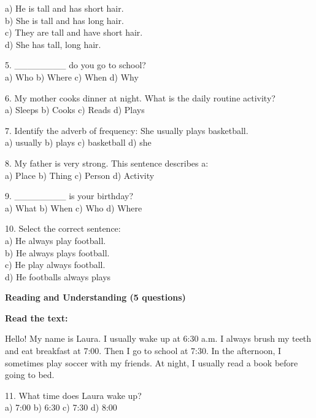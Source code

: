 \documentclass[12pt, a4paper]{article}
\begin{document}
\medskip{}

a) He is tall and has short hair. \\ b) She is tall and has long hair. \\ c)
They are tall and have short hair. \\ d) She has tall, long hair.

\smallskip

5. \_\_\_\_\_\_\_\_ do you go to school?\\
a) Who \quad b) Where \quad c) When \quad d) Why

\smallskip

6. My mother cooks dinner at night. What is the daily routine activity?\\
a) Sleeps \quad b) Cooks \quad c) Reads \quad d) Plays

\smallskip

7. Identify the adverb of frequency: She usually plays basketball.\\
a) usually \quad b) plays \quad c) basketball \quad d) she

\smallskip

8. My father is very strong. This sentence describes a:\\
a) Place \quad b) Thing \quad c) Person \quad d) Activity

\smallskip

9. \_\_\_\_\_\_\_\_ is your birthday?\\
a) What \quad b) When \quad c) Who \quad d) Where

\smallskip

10. Select the correct sentence: \\
a) He always play football. \\
b) He always plays football. \\
c) He play always football. \\
d) He footballs always plays

\begin{center}
    \large \textbf{Reading and Understanding (5 questions)}
\end{center}

\textbf{Read the text:}

Hello! My name is Laura. I usually wake up at 6:30 a.m. I always brush my teeth
and eat breakfast at 7:00. Then I go to school at 7:30. In the afternoon, I
sometimes play soccer with my friends. At night, I usually read a book before
going to bed.

11. What time does Laura wake up?\\
a) 7:00 \quad b) 6:30 \quad c) 7:30 \quad d) 8:00
\end{document}
